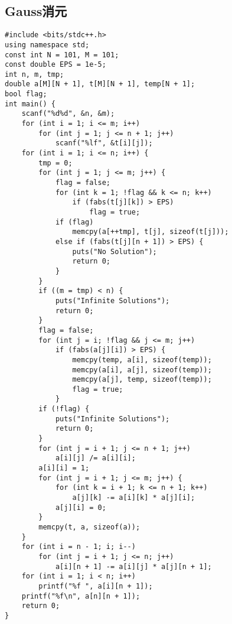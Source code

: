 \documentclass[a4paper]{article}
\begin{document}
\subsection{Gauss消元}
\begin{lstlisting}
#include <bits/stdc++.h>
using namespace std;
const int N = 101, M = 101;
const double EPS = 1e-5;
int n, m, tmp;
double a[M][N + 1], t[M][N + 1], temp[N + 1];
bool flag;
int main() {
    scanf("%d%d", &n, &m);
    for (int i = 1; i <= m; i++)
        for (int j = 1; j <= n + 1; j++)
            scanf("%lf", &t[i][j]);
    for (int i = 1; i <= n; i++) {
        tmp = 0;
        for (int j = 1; j <= m; j++) {
            flag = false;
            for (int k = 1; !flag && k <= n; k++)
                if (fabs(t[j][k]) > EPS)
                    flag = true;
            if (flag)
                memcpy(a[++tmp], t[j], sizeof(t[j]));
            else if (fabs(t[j][n + 1]) > EPS) {
                puts("No Solution");
                return 0;
            }
        }
        if ((m = tmp) < n) {
            puts("Infinite Solutions");
            return 0;
        }
        flag = false;
        for (int j = i; !flag && j <= m; j++)
            if (fabs(a[j][i]) > EPS) {
                memcpy(temp, a[i], sizeof(temp));
                memcpy(a[i], a[j], sizeof(temp));
                memcpy(a[j], temp, sizeof(temp));
                flag = true;
            }
        if (!flag) {
            puts("Infinite Solutions");
            return 0;
        }
        for (int j = i + 1; j <= n + 1; j++)
            a[i][j] /= a[i][i];
        a[i][i] = 1;
        for (int j = i + 1; j <= m; j++) {
            for (int k = i + 1; k <= n + 1; k++)
                a[j][k] -= a[i][k] * a[j][i];
            a[j][i] = 0;
        }
        memcpy(t, a, sizeof(a));
    }
    for (int i = n - 1; i; i--)
        for (int j = i + 1; j <= n; j++)
            a[i][n + 1] -= a[i][j] * a[j][n + 1];
    for (int i = 1; i < n; i++)
        printf("%f ", a[i][n + 1]);
    printf("%f\n", a[n][n + 1]);
    return 0;
}
\end{lstlisting}
\end{document}
